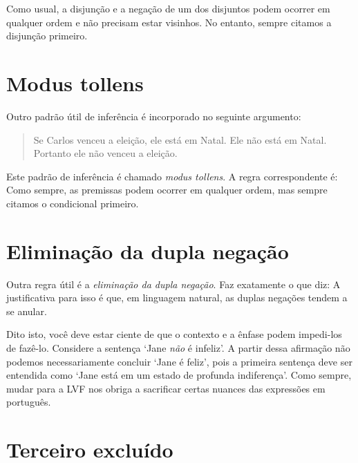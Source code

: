 Como usual, a disjun\c c\~ao e a nega\c c\~ao de um dos disjuntos podem ocorrer em qualquer ordem e n\~ao precisam estar visinhos. No entanto, sempre citamos a disjun\c c\~ao primeiro.

\section{Modus tollens}
Outro padr\~ao  \'util de infer\^encia \'e incorporado no seguinte argumento:
	\begin{quote}
		Se Carlos venceu a elei\c c\~ao, ele est\'a em Natal. Ele n\~ao est\'a em Natal. Portanto ele n\~ao venceu a elei\c c\~ao.
	\end{quote}
Este padr\~ao de infer\^encia \'e chamado \emph{modus tollens}. A regra correspondente \'e:
Como sempre, as premissas podem ocorrer em qualquer ordem, mas sempre citamos o condicional primeiro. 

\section{Elimina\c c\~ao da dupla nega\c c\~ao}
Outra regra  \'util \'e a  \emph{elimina\c c\~ao da dupla nega\c c\~ao}. Faz exatamente o que diz:
A justificativa para isso \'e que, em linguagem natural, as duplas nega\c c\~oes tendem a se anular.

Dito isto, você deve estar ciente de que o contexto e a ênfase podem impedi-los de fazê-lo. Considere a senten\c ca `Jane \emph{n\~ao} \'e infeliz’.  A partir dessa afirma\c c\~ao  n\~ao podemos necessariamente concluir `Jane \'e feliz’, pois a primeira senten\c ca deve ser entendida como  `Jane est\'a em um estado de profunda indiferen\c ca’. 
  Como sempre, mudar para a LVF nos obriga a sacrificar certas nuances das express\~oes em portugu\^es. 

\section{Terceiro exclu\'ido}

